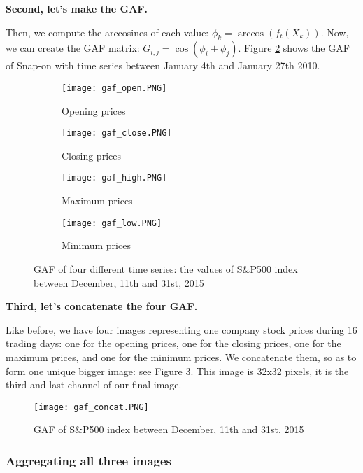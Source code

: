 \documentclass[11pt]{article}
\begin{document}
\begin{onehalfspace}
\noindent \textbf{Second, let's make the GAF.}

Then, we compute the arccosines of each value: $\phi_k = \arccos(f_t(X_k))$. Now, we can create the GAF matrix: $G_{i,j} = \cos(\phi_i + \phi_j)$. Figure \ref{fig:gaf4} shows the GAF of Snap-on with time series between January 4th and January 27th 2010.

\begin{figure}[h!]
    \centering
    \captionsetup{justification=centering}
    \begin{subfigure}{0.24\textwidth}
        \texttt{[image: gaf\_open.PNG]}
        \caption{Opening prices}
        \label{fig:open_concat}
    \end{subfigure}
    \begin{subfigure}{0.24\textwidth}
        \texttt{[image: gaf\_close.PNG]}
        \caption{Closing prices}
    \end{subfigure}
    \begin{subfigure}{0.24\textwidth}
        \texttt{[image: gaf\_high.PNG]}
        \caption{Maximum prices}
    \end{subfigure}    
    \begin{subfigure}{0.24\textwidth}
        \texttt{[image: gaf\_low.PNG]}
        \caption{Minimum prices}
    \end{subfigure}
    \caption{GAF of four different time series: the values of S\&P500 index between December, 11th and 31st, 2015}
    \label{fig:gaf4}
\end{figure}

\noindent \textbf{Third, let's concatenate the four GAF.}

Like before, we have four images representing one company stock prices during 16 trading days: one for the opening prices, one for the closing prices, one for the maximum prices, and one for the minimum prices. We concatenate them, so as to form one unique bigger image: see Figure \ref{fig:gaf_concat}. This image is 32x32 pixels, it is the third and last channel of our final image. 

\begin{figure}[h!]
    \centering
    \captionsetup{justification=centering}
    \texttt{[image: gaf\_concat.PNG]}
    \caption{GAF of S\&P500 index between December, 11th and 31st, 2015}
\label{fig:gaf_concat}
\end{figure}

\subsubsection{Aggregating all three images}


\end{onehalfspace}
\end{document}
